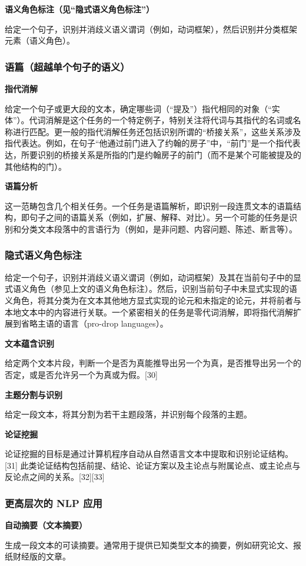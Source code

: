 \textbf{语义角色标注（见“隐式语义角色标注”）}  

给定一个句子，识别并消歧义语义谓词（例如，动词框架），然后识别并分类框架元素（语义角色）。
\subsubsection{语篇（超越单个句子的语义）}
\textbf{指代消解}  

给定一个句子或更大段的文本，确定哪些词（“提及”）指代相同的对象（“实体”）。代词消解是这个任务的一个特定例子，特别关注将代词与其指代的名词或名称进行匹配。更一般的指代消解任务还包括识别所谓的“桥接关系”，这些关系涉及指代表达。例如，在句子“他通过前门进入了约翰的房子”中，“前门”是一个指代表达，所要识别的桥接关系是所指的门是约翰房子的前门（而不是某个可能被提及的其他结构的门）。

\textbf{语篇分析}  

这一范畴包含几个相关任务。一个任务是语篇解析，即识别一段连贯文本的语篇结构，即句子之间的语篇关系（例如，扩展、解释、对比）。另一个可能的任务是识别和分类文本段落中的言语行为（例如，是非问题、内容问题、陈述、断言等）。
\subsubsection{隐式语义角色标注}  
给定一个句子，识别并消歧义语义谓词（例如，动词框架）及其在当前句子中的显式语义角色（参见上文的语义角色标注）。然后，识别当前句子中未显式实现的语义角色，将其分类为在文本其他地方显式实现的论元和未指定的论元，并将前者与本地文本中的内容进行关联。一个紧密相关的任务是零代词消解，即将指代消解扩展到省略主语的语言（pro-drop languages）。

\textbf{文本蕴含识别}  

给定两个文本片段，判断一个是否为真能推导出另一个为真，是否推导出另一个的否定，或是否允许另一个为真或为假。[30]

\textbf{主题分割与识别}  

给定一段文本，将其分割为若干主题段落，并识别每个段落的主题。

\textbf{论证挖掘}

论证挖掘的目标是通过计算机程序自动从自然语言文本中提取和识别论证结构。[31] 此类论证结构包括前提、结论、论证方案以及主论点与附属论点、或主论点与反论点之间的关系。[32][33]
\subsubsection{更高层次的 NLP 应用}
\textbf{自动摘要（文本摘要）} 

生成一段文本的可读摘要。通常用于提供已知类型文本的摘要，例如研究论文、报纸财经版的文章。

